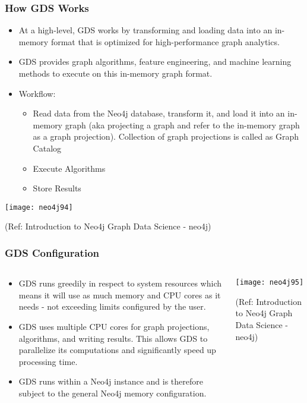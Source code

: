 \begin{frame}[fragile]\frametitle{How GDS Works}

\begin{itemize}
\item At a high-level, GDS works by transforming and loading data into an in-memory format that is optimized for high-performance graph analytics. 
\item GDS provides graph algorithms, feature engineering, and machine learning methods to execute on this in-memory graph format.
\item Workflow: 
	\begin{itemize}
	\item Read data from the Neo4j database, transform it, and load it into an in-memory graph (aka  projecting a graph and refer to the in-memory graph as a graph projection). Collection of graph projections is called as Graph Catalog
	\item Execute Algorithms
	\item Store Results
	\end{itemize}
\end{itemize}

\begin{center}
\texttt{[image: neo4j94]}
\end{center}	

{\tiny (Ref: Introduction to Neo4j Graph Data Science - neo4j)}
\end{frame}

\begin{frame}[fragile]\frametitle{GDS Configuration}
\begin{columns}
\begin{column}{0.5\textwidth}

\begin{itemize}
\item GDS runs greedily in respect to system resources which means it will use as much memory and CPU cores as it needs - not exceeding limits configured by the user.
\item GDS uses multiple CPU cores for graph projections, algorithms, and writing results. This allows GDS to parallelize its computations and significantly speed up processing time.
\item GDS runs within a Neo4j instance and is therefore subject to the general Neo4j memory configuration. 
\end{itemize}

\end{column}
\begin{column}{0.5\textwidth}  %

\begin{center}
\texttt{[image: neo4j95]}
\end{center}	

{\tiny (Ref: Introduction to Neo4j Graph Data Science - neo4j)}
\end{column}
\end{columns}
\end{frame}

